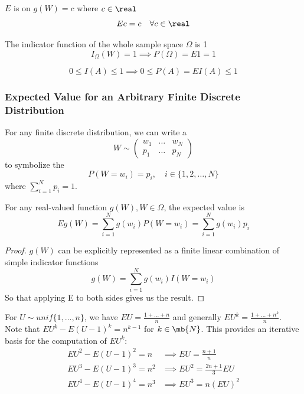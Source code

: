 \documentclass[11pt]{article}
\numberwithin{equation}{section}
\begin{document}
$E$ is  on $g(W) = c$ where $c \in \real$
\begin{equation}
	Ec = c \quad \forall c \in \real
\end{equation}

\property
The indicator function of the whole sample space $\Omega$ is 1
\begin{equation}
	I_\Omega(W) = 1 \implies P(\Omega) = E1 = 1
\end{equation}

\begin{equation}
	0 \leq I(A) \leq 1 \implies 0\leq P(A) = EI(A) \leq 1
\end{equation}

\subsubsection{Expected Value for an Arbitrary Finite Discrete Distribution}
 For any finite discrete distribution, we can write a  
\begin{equation}
	W \sim \begin{pmatrix}
		w_1 & \hdots & w_N\\
		p_1 & \hdots & p_N
	\end{pmatrix}
\end{equation}
to symbolize the 
$$P(W = w_i) = p_i, \quad i \in \{1, 2, \hdots, N\}$$
where $\sum_{i=1}^Np_i = 1$.

\corollary
For any real-valued function $g(W), W \in \Omega$, the expected value is
\begin{equation}
	Eg(W) = \sum_{i=1}^Ng(w_i)P(W = w_i) = \sum_{i=1}^Ng(w_i)p_i
\end{equation}
\begin{proof}
	$g(W)$ can be explicitly represented as a finite linear combination of simple indicator functions
	$$g(W) = \sum_{i=1}^N g(w_i)I(W = w_i)$$
	So that applying E to both sides gives us the result.
\end{proof}

\remark
For $U \sim unif\{1, \hdots, n\}$, we have $EU = \frac{1 + \hdots + n}{n}$ and generally $EU^k = \frac{1 + \hdots + n^k}{n}$. \\
Note that $EU^k - E(U-1)^k = n^{k-1}$ for $k \in \mb{N}$. This provides an iterative basis for the computation of $EU^k$:
\begin{align}
EU^2 - E(U-1)^2 = n &\implies EU = \frac{n+1}{n} \\	
EU^3 - E(U-1)^3 = n^2 &\implies EU^2 = \frac{2n+1}{3}EU \\	
EU^4 - E(U-1)^4 = n^3 &\implies EU^3 = n(EU)^2 \\	
\end{align}
\end{document}
